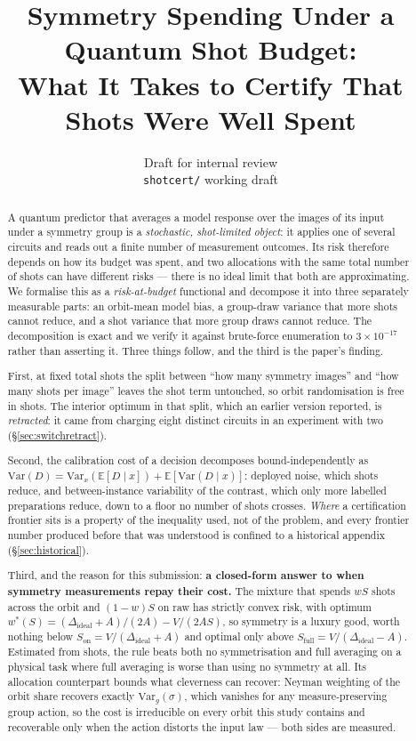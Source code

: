 \documentclass{article}
\title{Symmetry Spending Under a Quantum Shot Budget:\\
What It Takes to Certify That Shots Were Well Spent}
\author{Draft for internal review\\ \texttt{shotcert/} working draft}
\begin{document}
\maketitle

\begin{abstract}
A quantum predictor that averages a model response over the images of its input under a symmetry
group is a \emph{stochastic, shot-limited object}: it applies one of several circuits and reads out a
finite number of measurement outcomes. Its risk therefore depends on how its budget was spent, and
two allocations with the same total number of shots can have different risks --- there is no ideal
limit that both are approximating. We formalise this as a \emph{risk-at-budget} functional and
decompose it into three separately measurable parts: an orbit-mean model bias, a group-draw variance
that more shots cannot reduce, and a shot variance that more group draws cannot reduce. The
decomposition is exact and we verify it against brute-force enumeration to
$3\times10^{-17}$ rather than asserting it. Three things follow, and the third is the paper's finding.

First, at fixed total shots the split between ``how many symmetry images'' and ``how many shots per
image'' leaves the shot term untouched, so orbit randomisation is free in shots. The interior optimum in
that split, which an earlier version reported, is \emph{retracted}: it came from charging eight distinct
circuits in an experiment with two (\S\ref{sec:switchretract}).

Second, the calibration cost of a decision decomposes bound-independently as
$\mathrm{Var}(D)=\mathrm{Var}_x(\mathbb{E}[D\mid x])+\mathbb{E}[\mathrm{Var}(D\mid x)]$: deployed noise,
which shots reduce, and between-instance variability of the contrast, which only more labelled
preparations reduce, down to a floor no number of shots crosses. \emph{Where} a certification frontier
sits is a property of the inequality used, not of the problem, and every frontier number produced before
that was understood is confined to a historical appendix (\S\ref{sec:historical}).

Third, and the reason for this submission: \textbf{a closed-form answer to when symmetry measurements
repay their cost.} The mixture that spends $wS$ shots across the orbit and $(1-w)S$ on raw has strictly
convex risk, with optimum $w^\ast(S)=(\Delta_{\mathrm{ideal}}+A)/(2A)-V/(2AS)$, so symmetry is a
luxury good, worth nothing below $S_{\mathrm{on}}=V/(\Delta_{\mathrm{ideal}}+A)$ and optimal only
above $S_{\mathrm{full}}=V/(\Delta_{\mathrm{ideal}}-A)$. Estimated from shots, the rule beats both
no symmetrisation and full averaging on a physical task where full averaging is worse than using no
symmetry at all. Its allocation counterpart bounds what cleverness can recover: Neyman weighting of the
orbit share recovers exactly $\mathrm{Var}_g(\sigma)$, which vanishes for any measure-preserving group
action, so the cost is irreducible on every orbit this study contains and recoverable only when the
action distorts the input law --- both sides are measured.


\end{abstract}
\end{document}
